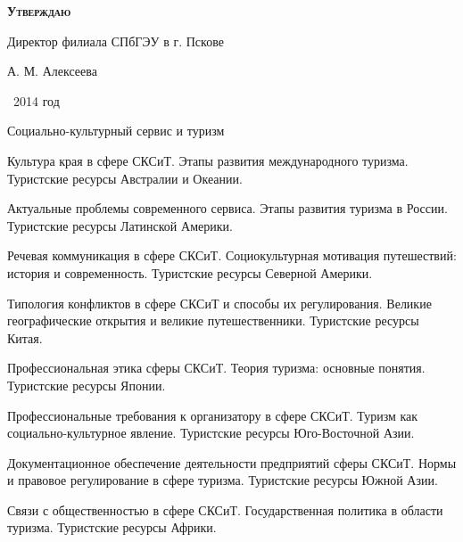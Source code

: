\documentclass[
	11pt,
	a4paper,
	]
	{article}
\begin{document}
\newlength{\pblength}\settowidth{\pblength}{Директор филиала СПбГЭУ в г. Пскове}

\hfill\parbox{\pblength}{
	\textbf{\textsc{Утверждаю}}\medskip

	Директор филиала СПбГЭУ в г. Пскове\medskip

	\makebox[3cm]{\hrulefill} А. М. Алексеева\medskip

	\makebox[1.5cm]{<<\hrulefill>>} \makebox[3cm]{\hrulefill}\ 2014 год
}


 {Социально-культурный сервис и туризм}

	

\noindent{} 
	{
		Культура края в сфере СКСиТ.
	}{
		Этапы развития международного туризма.
	}{
		Туристские ресурсы Австралии и Океании.
	}

\bigskip

\noindent{} 
	{
		Актуальные проблемы современного сервиса.
	}{
		Этапы развития туризма в России.
	}{
		Туристские ресурсы Латинской Америки.
	}

\bigskip

\noindent{} 
	{
		Речевая коммуникация в сфере СКСиТ.
	}{
		Социокультурная мотивация путешествий: история и современность.
	}{
		Туристские ресурсы Северной Америки.
	}

\bigskip

\noindent{} 
	{
		Типология конфликтов в сфере СКСиТ и способы их регулирования.
	}{
		Великие географические открытия и великие путешественники.
	}{
		Туристские ресурсы Китая.
	}

\bigskip

\noindent{} 
	{
		Профессиональная этика сферы СКСиТ.
	}{
		Теория туризма: основные понятия.
	}{
		Туристские ресурсы Японии.
	}

\bigskip

\noindent{} 
	{
		Профессиональные требования к организатору в сфере СКСиТ.
	}{
		Туризм как социально-культурное явление.
	}{
		Туристские ресурсы Юго-Восточной Азии.
	}

\bigskip

\noindent{} 
	{
		Документационное обеспечение деятельности предприятий сферы СКСиТ.
	}{
		Нормы и правовое регулирование в сфере туризма.
	}{
		Туристские ресурсы Южной Азии.
	}

\bigskip

\noindent{} 
	{
		Связи с общественностью в сфере СКСиТ.
	}{
		Государственная политика в области туризма.
	}{
		Туристские ресурсы Африки.
	}
\end{document}
